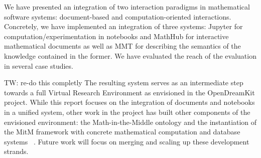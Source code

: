 
We have presented an integration of two interaction paradigms in mathematical software systems: document-based and computation-oriented interactions. Concretely, we have implemented an integration of three systems:
Jupyter for computation/experimentation in notebooks and MathHub for interactive mathematical documents as well as MMT for describing the semantics of the knowledge contained in the former.
We have evaluated the reach of the evaluation in several case studies.

\begin{oldpart}{TW: re-do this completly}
 The resulting system serves as an intermediate step towards a full Virtual Research Environment as envisioned in the OpenDreamKit project. While this report focuses on the integration of documents and notebooks in a unified system, other work in the project has built other components of the envisioned environment: the Math-in-the-Middle ontology \cite{KohMuePfe:kbimss17} and the instantiation of the MitM framework with concrete mathematical computation and database systems ~\cite{WieKohRab:vtuimkb17}.
Future work will focus on merging and scaling up these development strands.
\end{oldpart}


